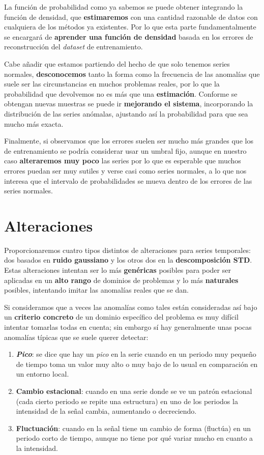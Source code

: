 La función de probabilidad como ya sabemos se puede obtener integrando la función de densidad, que \textbf{estimaremos} con una cantidad razonable de datos con cualquiera de los métodos ya existentes. Por lo que esta parte fundamentalmente se encargará de \textbf{aprender una función de densidad} basada en los errores de reconstrucción del \emph{dataset} de entrenamiento.

Cabe añadir que estamos partiendo del hecho de que solo tenemos series normales, \textbf{desconocemos} tanto la forma como la frecuencia de las anomalías que suele ser las circunstancias en muchos problemas reales, por lo que la probabilidad que devolvemos no es más que una \textbf{estimación}. Conforme se obtengan nuevas muestras se puede ir \textbf{mejorando el sistema}, incorporando la distribución de las series anómalas, ajustando así la probabilidad para que sea mucho más exacta.

Finalmente, si observamos que los errores suelen ser mucho más grandes que los de entrenamiento se podría considerar usar un umbral fijo, aunque en nuestro caso \textbf{alteraremos muy poco} las series por lo que es esperable que muchos errores puedan ser muy sutiles y verse casi como series normales, a lo que nos interesa que el intervalo de probabilidades se mueva dentro de los errores de las series normales.

\chapter{Alteraciones}\label{ch:ad-alteraciones}

Proporcionaremos cuatro tipos distintos de alteraciones para series temporales: dos basados en \textbf{ruido gaussiano} y los otros dos en la \textbf{descomposición STD}. Estas alteraciones intentan ser lo más \textbf{genéricas} posibles para poder ser aplicadas en un \textbf{alto rango} de dominios de problemas y lo más \textbf{naturales} posibles, intentando imitar las anomalías reales que se dan.

Si consideramos que a veces las anomalías como tales están consideradas así bajo un \textbf{criterio concreto} de un dominio específico del problema es muy difícil intentar tomarlas todas en cuenta; sin embargo sí hay generalmente unas pocas anomalías típicas que se suele querer detectar:

\begin{enumerate}
  \item \textbf{\emph{Pico}}: se dice que hay un \emph{pico} en la serie cuando en un periodo muy pequeño de tiempo toma un valor muy alto o muy bajo de lo usual en comparación en un entorno local.
  \item \textbf{Cambio estacional}: cuando en una serie donde se ve un patrón estacional (cada cierto periodo se repite una estructura) en uno de los periodos la intensidad de la señal cambia, aumentando o decreciendo.
  \item \textbf{Fluctuación}: cuando en la señal tiene un cambio de forma (fluctúa) en un periodo corto de tiempo, aunque no tiene por qué variar mucho en cuanto a la intensidad.
\end{enumerate}

